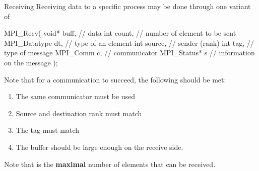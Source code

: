 \begin{frame}[fragile]{Receiving}
	Receiving data to a specific process may be done through one variant of
	\begin{ccode}
MPI_Recv(
	void* buff,      // data
	int count,       // number of element to be sent
	MPI_Datatype dt, // type of an element
	int source,      // sender (rank)
	int tag,         // type of message
	MPI_Comm c,      // communicator
	MPI_Status* s    // information on the message
);
	\end{ccode}
	Note that for a communication to succeed, the following should be met:\begin{enumerate}
		\item The same communicator must be used
		\item Source and destination rank must match
		\item The tag must match
		\item The buffer should be large enough on the receive side.
	\end{enumerate}
	Note that  is the \textbf{maximal} number of elements that can be received.
	
\end{frame}


